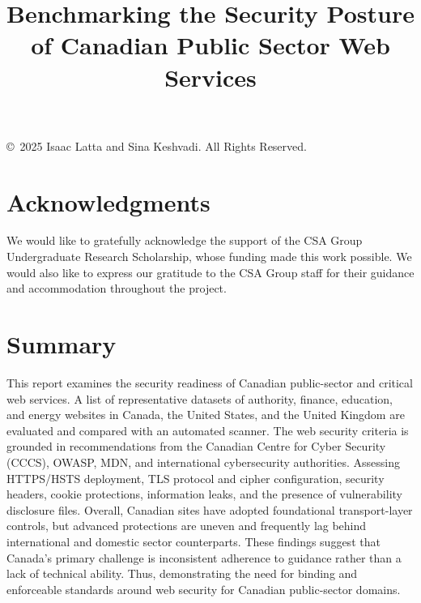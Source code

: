 \documentclass[pdflatex,sn-mathphys-num]{sn-jnl}
\numberwithin{equation}{section}
\theoremstyle{thmstyleone}
\theoremstyle{thmstyletwo}%
\theoremstyle{thmstylethree}%
\begin{document}
\title[Article Title]{Benchmarking the Security Posture of Canadian Public Sector Web Services}

\author[1]{ \footnotemark[1]}
\author[1]{ \footnotemark[3]}



\maketitle

\vfill
\begin{center}
\small
\copyright~2025 Isaac Latta and 
Sina Keshvadi. All Rights Reserved.
\end{center}
\clearpage

\section{Acknowledgments}
We would like to gratefully acknowledge the support of the CSA Group Undergraduate Research Scholarship, 
whose funding made this work possible. We would also like to express our gratitude 
to the CSA Group staff for their guidance and accommodation throughout the project.

\section{Summary}
This report examines the security readiness of Canadian public-sector and critical web 
services. A list of representative datasets of 
authority, finance, education, and energy websites in Canada, the United States, and the United 
Kingdom are evaluated and compared with an automated scanner. 
The web security criteria is grounded in recommendations from the Canadian Centre 
for Cyber Security (CCCS), OWASP, MDN, and international cybersecurity authorities. Assessing
HTTPS/HSTS  deployment, TLS protocol and cipher configuration, security headers, cookie
protections, information leaks, and the presence of vulnerability disclosure files. 
Overall, Canadian sites have adopted foundational 
transport-layer controls, but advanced protections are uneven and frequently lag behind international 
and domestic sector counterparts. These findings suggest that Canada’s primary challenge is
inconsistent adherence to guidance rather than a lack of technical ability. 
Thus, demonstrating the need for binding and enforceable standards around web security 
for Canadian public-sector domains. 
\end{document}
